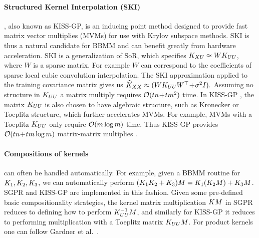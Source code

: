 \paragraph{Structured Kernel Interpolation (SKI)} \cite{wilson2015kernel}, also known as KISS-GP, is an inducing point method designed to provide fast matrix vector multiplies (MVMs) for use with Krylov subspace methods. SKI is thus a natural candidate for BBMM and can benefit greatly from hardware acceleration.
SKI is a generalization of SoR, which specifies $K_{XU} \approx WK_{UU}$, where $W$ is a sparse matrix. For example $W$ can correspond to the coefficients of sparse local cubic convolution interpolation.
The SKI approximation applied to the training covariance matrix gives us
$
\widehat{K}_{XX} \approx (WK_{UU}W^{\top} \! + \! \sigma^{2}I).
$
Assuming no structure in $K_{UU}$ a matrix multiply requires $\bigo{tn \! + \! tm^{2}}$ time. In KISS-GP \citep{wilson2015kernel,wilson2015thoughts}, the matrix $K_{UU}$ is also chosen to have algebraic structure, such as Kronecker or Toeplitz structure, which further accelerates MVMs. For example, MVMs with a Toeplitz $K_{UU}$ only require $\bigo{m \log m}$ time. Thus KISS-GP
provides $\bigo{tn \! + \! tm \log m}$ matrix-matrix multiplies \cite{wilson2015kernel}.

\paragraph{Compositions of kernels} can often be handled automatically.
For example, given a BBMM routine for $K_{1},K_{2},K_{3}$, we can automatically perform $(K_{1}K_{2}+K_{3})M = K_{1}(K_{2}M) + K_{3}M$.
SGPR and KISS-GP are implemented in this fashion. Given some pre-defined basic compositionality strategies, the kernel matrix multiplication $KM$ in SGPR reduces to defining how to perform $K_{UU}^{-1}M$, and similarly for KISS-GP it reduces to performing multiplication with a Toeplitz matrix $K_{UU}M$. For product kernels one can follow Gardner et al.~\cite{gardner2018product}.



